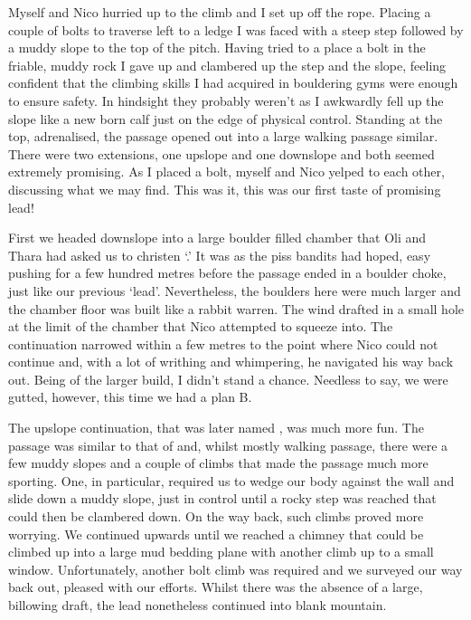 Myself and Nico hurried up  to the climb and I set up off the
rope. Placing a couple of bolts to traverse left to a ledge I was faced
with a steep step followed by a muddy slope to the top of the pitch.
Having tried to a place a bolt in the friable, muddy rock I gave up and
clambered up the step and the slope, feeling confident that the climbing
skills I had acquired in  bouldering gyms were enough to ensure
safety. In hindsight they probably weren't as I awkwardly fell up the
slope like a new born calf just on the edge of physical control.
Standing at the top, adrenalised, the passage opened out into a large
walking passage similar. There were two extensions, one upslope and one
downslope and both seemed extremely promising. As I placed a bolt,
myself and Nico yelped to each other, discussing what we may find. This
was it, this was our first taste of promising lead!


First we headed downslope into a large boulder filled chamber that Oli
and Thara had asked us to christen `.' It was as the
piss bandits had hoped, easy pushing for a few hundred metres before the
passage ended in a boulder choke, just like our previous `lead'.
Nevertheless, the boulders here were much larger and the chamber floor
was built like a rabbit warren. The wind drafted in a small hole at the
limit of the chamber that Nico attempted to squeeze into. The
continuation narrowed within a few metres to the point where Nico could
not continue and, with a lot of writhing and whimpering, he navigated
his way back out. Being of the larger build, I didn't stand a chance.
Needless to say, we were gutted, however, this time we had a plan B.


The upslope continuation, that was later named , was
much more fun. The passage was similar to that of  and, whilst
mostly walking passage, there were a few muddy slopes and a couple of
climbs that made the passage much more sporting. One, in particular,
required us to wedge our body against the wall and slide down a muddy
slope, just in control until a rocky step was reached that could then be
clambered down. On the way back, such climbs proved more worrying. We
continued upwards until we reached a chimney that could be climbed up
into a large mud bedding plane with another climb up to a small window.
Unfortunately, another bolt climb was required and we surveyed our way
back out, pleased with our efforts. Whilst there was the absence of a
large, billowing draft, the lead nonetheless continued into blank
mountain.

